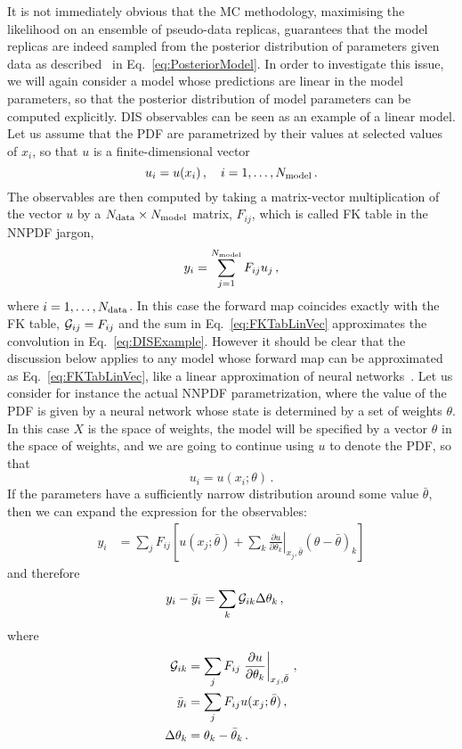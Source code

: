 It is not immediately obvious that the MC methodology, maximising the likelihood
on an ensemble of pseudo-data replicas, guarantees that the model replicas
are indeed sampled from the posterior distribution of parameters given data as
described \eg\ in Eq.~\ref{eq:PosteriorModel}. In order to investigate this
issue, we will again consider a model whose predictions are linear in the model
parameters, so that the posterior distribution of model parameters can be computed
explicitly. DIS observables can be seen as an example of a linear model. Let us assume 
that the PDF are parametrized by their values at selected values of $x_i$, so that
$u$ is a finite-dimensional vector 
\begin{equation}
    \label{eq:Uvector}
    u_i = u(x_i)\, , \quad i = 1, \ldots, N_{\rm model}\, .    
\end{equation}
The observables are then computed by taking a matrix-vector multiplication of the 
vector $u$ by a $N_{\rm data} \times N_{\rm model}$ matrix, $F_{ij}$, which is called FK table in the 
NNPDF jargon, 
\begin{equation}
    \label{eq:FKTabLinVec}
    y_i = \sum_{j=1}^{N_{\rm model}} F_{ij} u_j\, ,
\end{equation}
where $i=1,\ldots,N_{\rm data}$. In this case the forward map coincides exactly with the 
FK table, $\mathcal{G}_{ij} = F_{ij}$ and the sum in Eq.~\ref{eq:FKTabLinVec} approximates 
the convolution in Eq.~\ref{eq:DISExample}. However it should be clear that the discussion below applies to any 
model whose forward map can be approximated as Eq.~\eqref{eq:FKTabLinVec}, like a linear 
approximation of neural networks~\cite{ADVANI2020428}. Let us consider for instance the actual NNPDF parametrization, 
where the value of the PDF is given by a neural network whose state is determined by a set of 
weights $\theta$. In this case $X$ is the space of weights, the model will be specified by a vector 
$\theta$ in the space of weights, and we are going to continue using $u$ to denote the PDF, so that 
\begin{equation}
    \label{eq:WeightsParam}
    u_i = u(x_i; \theta)\, .
\end{equation}
If the parameters have a sufficiently narrow distribution around some value $\bar\theta$, then
we can expand the expression for the observables:
\begin{align}
    y_i  &= 
        \sum_j F_{ij} \left[u(x_j; \bar\theta)
         + \sum_k \left.\frac{\partial u}{\partial \theta_k}\right|_{x_j,\bar\theta} 
         \left(\theta - \bar\theta\right)_k
        \right]
\end{align}
and therefore
\begin{align}
    y_i - \bar{y}_i &=
         \sum_k \mathcal{G}_{ik} \Delta\theta_k
        \,,         
\end{align}
where 
\begin{align}
    \mathcal{G}_{ik} &= 
        \sum_j F_{ij} \left.\frac{\partial u}{\partial \theta_k}\right|_{x_j,\bar\theta}\, , \\
    \bar{y}_i &= \sum_j F_{ij} u(x_j; \bar\theta)\, , \\
    \Delta\theta_k &= \theta_k - \bar\theta_k\, .
\end{align}

